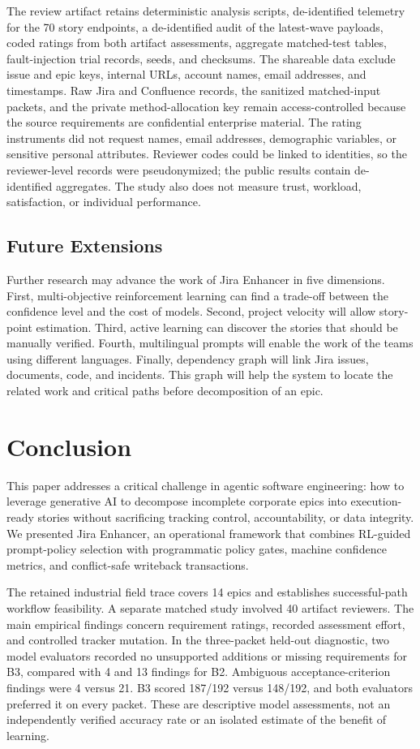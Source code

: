 \documentclass[pdflatex,sn-basic]{sn-jnl}
\begin{document}
The review artifact retains deterministic analysis scripts, de-identified telemetry for the 70 story endpoints, a de-identified audit of the latest-wave payloads, coded ratings from both artifact assessments, aggregate matched-test tables, fault-injection trial records, seeds, and checksums. The shareable data exclude issue and epic keys, internal URLs, account names, email addresses, and timestamps. Raw Jira and Confluence records, the sanitized matched-input packets, and the private method-allocation key remain access-controlled because the source requirements are confidential enterprise material. The rating instruments did not request names, email addresses, demographic variables, or sensitive personal attributes. Reviewer codes could be linked to identities, so the reviewer-level records were pseudonymized; the public results contain de-identified aggregates. The study also does not measure trust, workload, satisfaction, or individual performance.

\subsection{Future Extensions}

Further research may advance the work of Jira Enhancer in five dimensions. First, multi-objective reinforcement learning can find a trade-off between the confidence level and the cost of models. Second, project velocity will allow story-point estimation. Third, active learning can discover the stories that should be manually verified. Fourth, multilingual prompts will enable the work of the teams using different languages. Finally, dependency graph will link Jira issues, documents, code, and incidents. This graph will help the system to locate the related work and critical paths before decomposition of an epic.

\section{Conclusion}\label{sec:conclusion}
This paper addresses a critical challenge in agentic software engineering: how to leverage generative AI to decompose incomplete corporate epics into execution-ready stories without sacrificing tracking control, accountability, or data integrity. We presented Jira Enhancer, an operational framework that combines RL-guided prompt-policy selection with programmatic policy gates, machine confidence metrics, and conflict-safe writeback transactions.

The retained industrial field trace covers 14 epics and establishes successful-path workflow feasibility. A separate matched study involved 40 artifact reviewers. The main empirical findings concern requirement ratings, recorded assessment effort, and controlled tracker mutation. In the three-packet held-out diagnostic, two model evaluators recorded no unsupported additions or missing requirements for B3, compared with 4 and 13 findings for B2. Ambiguous acceptance-criterion findings were 4 versus 21. B3 scored 187/192 versus 148/192, and both evaluators preferred it on every packet. These are descriptive model assessments, not an independently verified accuracy rate or an isolated estimate of the benefit of learning.
\end{document}
